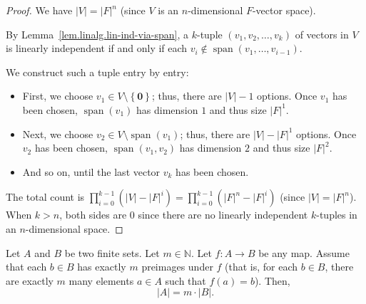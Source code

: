 \begin{proof}
\leanok
We have $\left\vert V\right\vert =\left\vert F\right\vert ^{n}$
(since $V$ is an $n$-dimensional $F$-vector space).

By Lemma~\ref{lem.linalg.lin-ind-via-span}, a $k$-tuple $\left(
v_{1},v_{2},\ldots,v_{k}\right)  $ of vectors in $V$ is linearly independent
if and only if each $v_i \notin \operatorname{span}(v_1, \ldots, v_{i-1})$.

We construct such a tuple entry by entry:
\begin{itemize}
\item First, we choose $v_{1} \in V\setminus
\left\{  \mathbf{0}\right\}$; thus, there
are $\left\vert V\right\vert - 1$ options.
Once $v_{1}$ has been chosen, $\operatorname{span}%
\left(  v_{1}\right)  $ has dimension $1$ and thus
size $\left\vert F\right\vert ^{1}$.

\item Next, we choose $v_{2} \in V\setminus
\operatorname{span}\left(  v_{1}\right)$; thus, there are
$\left\vert V\right\vert -\left\vert F\right\vert ^{1}$ options.
Once $v_{2}$ has been chosen, $\operatorname{span}\left(
v_{1},v_{2}\right)  $ has dimension $2$ and thus size
$\left\vert F\right\vert ^{2}$.

\item And so on, until the last vector $v_{k}$ has been chosen.
\end{itemize}

The total count is
$\prod_{i=0}^{k-1}\left(  \left\vert V\right\vert -\left\vert F\right\vert
^{i}\right)  =\prod_{i=0}^{k-1}\left(  \left\vert F\right\vert ^{n}-\left\vert
F\right\vert ^{i}\right)$
(since $\left\vert V\right\vert =\left\vert F\right\vert ^{n}$).
When $k > n$, both sides are $0$ since there are no linearly independent $k$-tuples
in an $n$-dimensional space.
\end{proof}

\begin{lemma}
\label{lem.count.multijection}
\leantarget
\leanok
Let $A$ and $B$ be two
finite sets. Let $m\in\mathbb{N}$. Let $f:A\rightarrow B$ be any map. Assume
that each $b\in B$ has exactly $m$ preimages under $f$ (that is, for each
$b\in B$, there are exactly $m$ many elements $a\in A$ such that $f\left(
a\right)  =b$). Then,
\[
\left\vert A\right\vert =m\cdot\left\vert B\right\vert .
\]
\end{lemma}

